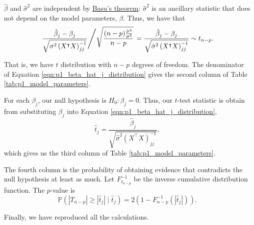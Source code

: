 \documentclass[letterpaper,11pt]{article}
\begin{document}
\begin{enumerate}
\begin{enumerate}
\begin{description}
      $\hat{\beta}$ and $\hat{\sigma}^2$ are independent by
      \href{https://en.wikipedia.org/wiki/Basu\%27s_theorem}{Basu's theorem}:
      $\hat{\sigma}^2$ is an ancillary statistic that does not depend on the
      model parameters, $\beta$. Thus, we have that
      \begin{equation}
        \left.
          \frac{\hat{\beta}_j - \beta_j}{\sqrt{\sigma^2\left(X^\intercal X\right)^{-1}_{jj}}}
          \middle/
          \sqrt{\frac{(n - p)\frac{\hat{\sigma}^2}{\sigma^2}}{n-p}}
        \right. 
        = \frac{\hat{\beta}_j - \beta_j}{\sqrt{\hat{\sigma}^2\left(X^\intercal X\right)^{-1}_{jj}}}
        \sim t_{n-p}.
        \label{eqn:p1_beta_hat_j_distribution}
      \end{equation}

      That is, we have $t$ distribution with $n - p$ degrees of freedom. The
      denominator of Equation \ref{eqn:p1_beta_hat_j_distribution} gives the
      second column of Table \ref{tab:p1_model_parameters}.

      For each $\beta_j$, our null hypothesis is $H_0: \beta_j = 0$. Thus, our
      $t$-test statistic is obtain from substituting $\beta_j$ into Equation
      \ref{eqn:p1_beta_hat_j_distribution},
      \begin{equation*}
        \hat{t}_j = \frac{\hat{\beta}_j}{\sqrt{\hat{\sigma}^2\left(X^\intercal X\right)^{-1}_{jj}}},
      \end{equation*}
      which gives us the third column of Table \ref{tab:p1_model_parameters}.

      The fourth column is the probability of obtaining evidence that
      contradicts the null hypothesis at least as much. Let $F^{-1}_{t_{n-p}}$
      be the inverse cumulative distribution function. The $p$-value is
      \begin{equation*}
        \mathbb{P}\left(
          \left\lvert T_{n - p}\right\rvert \geq
          \left\lvert \hat{t}_j\right\rvert
          \mid
          \hat{t}_j
        \right) = 
        2\left(1 - F^{-1}_{n - p}\left(\left\lvert\hat{t}_j\right\rvert\right)\right).
      \end{equation*}

      Finally, we have reproduced all the calculations.
    \end{description}
    

\end{enumerate}
\end{enumerate}
\end{document}

